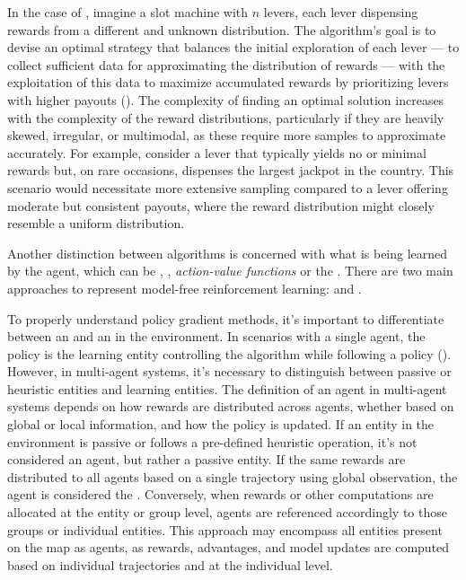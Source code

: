     \bigskip
    
    \noindent In the case of , imagine a slot machine with $n$ levers, each lever dispensing rewards from a different and unknown distribution. The algorithm's goal is to devise an optimal strategy that balances the initial exploration of each lever — to collect sufficient data for approximating the distribution of rewards — with the exploitation of this data to maximize accumulated rewards by prioritizing levers with higher payouts (\cite{Sutton1998}). The complexity of finding an optimal solution increases with the complexity of the reward distributions, particularly if they are heavily skewed, irregular, or multimodal, as these require more samples to approximate accurately. For example, consider a lever that typically yields no or minimal rewards but, on rare occasions, dispenses the largest jackpot in the country. This scenario would necessitate more extensive sampling compared to a lever offering moderate but consistent payouts, where the reward distribution might closely resemble a uniform distribution.
    
    \bigskip
    
    \noindent Another distinction between algorithms is concerned with what is being learned by the agent, which can be , , \textit{action-value functions} or the . There are two main approaches to represent model-free reinforcement learning:  and .
    
    \bigskip
    
    \noindent To properly understand policy gradient methods, it's important to differentiate between an  and an  in the environment. In scenarios with a single agent, the policy is the learning entity controlling the algorithm while following a policy (\textcolor{deepblue}{\cite{Sutton1998}}). However, in multi-agent systems, it's necessary to distinguish between passive or heuristic entities and learning entities. The definition of an agent in multi-agent systems depends on how rewards are distributed across agents, whether based on global or local information, and how the policy is updated. If an entity in the environment is passive or follows a pre-defined heuristic operation, it's not considered an agent, but rather a passive entity. If the same rewards are distributed to all agents based on a single trajectory using global observation, the agent is considered the . Conversely, when rewards or other computations are allocated at the entity or group level, agents are referenced accordingly to those groups or individual entities. This approach may encompass all entities present on the map as agents, as rewards, advantages, and model updates are computed based on individual trajectories and at the individual level.
    
